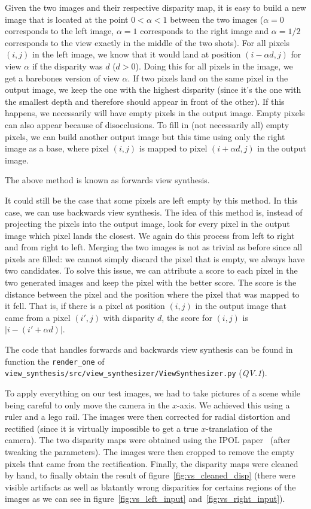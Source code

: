 Given the two images and their respective disparity map, it is easy to build a new image that is located at the
point $0<\alpha<1$ between the two images ($\alpha=0$ corresponds to the left image, $\alpha=1$ corresponds to the
right image and $\alpha=1/2$ corresponds to the view exactly in the middle of the two shots).
For all pixels $(i,j)$ in the left image, we know that it would land at position $(i-\alpha d,j)$ for view $\alpha$ if
the disparity was $d$ ($d>0$).
Doing this for all pixels in the image, we get a barebones version of view $\alpha$.
If two pixels land on the same pixel in the output image, we keep the one with the highest disparity (since it's the
one with the smallest depth and therefore should appear in front of the other).
If this happens, we necessarily will have empty pixels in the output image.
Empty pixels can also appear because of disocclusions.
To fill in (not necessarily all) empty pixels, we can build another output image but this time using only the right
image as a base, where pixel $(i,j)$ is mapped to pixel $(i+\alpha d,j)$ in the output image.

The above method is known as forwards view synthesis.

It could still be the case that some pixels are left empty by this method.
In this case, we can use backwards view synthesis.
The idea of this method is, instead of projecting the pixels into the output image, look for every pixel in the output
image which pixel lands the closest.
We again do this process from left to right and from right to left.
Merging the two images is not as trivial as before since all pixels are filled: we cannot simply discard the pixel that
is empty, we always have two candidates.
To solve this issue, we can attribute a score to each pixel in the two generated images and keep the pixel with the
better score.
The score is the distance between the pixel and the position where the pixel that was mapped to it fell.
That is, if there is a pixel at position $(i,j)$ in the output image that came from a pixel $(i',j)$ with disparity $d$,
the score for $(i,j)$ is $|i-(i'+\alpha d)|$.

The code that handles forwards and backwards view synthesis can be found in function the \texttt{render\_one} of
\texttt{view\_synthesis/src/view\_synthesizer/ViewSynthesizer.py} (\textit{QV.1}).

To apply everything on our test images, we had to take pictures of a scene while being careful to only move the camera
in the $x$-axis.
We achieved this using a ruler and a lego rail.
The images were then corrected for radial distortion and rectified
(since it is virtually impossible to get a true $x$-translation of the camera).
The two disparity maps were obtained using the IPOL paper~\citep*{stereomatching} (after tweaking the parameters).
The images were then cropped to remove the empty pixels that came from the rectification.
Finally, the disparity maps were cleaned by hand, to finally obtain the result of figure~\ref{fig:vs_cleaned_disp}
(there were visible artifacts as well as blatantly wrong disparities for certains regions of the images
as we can see in figure~\ref{fig:vs_left_input} and~\ref{fig:vs_right_input}).

